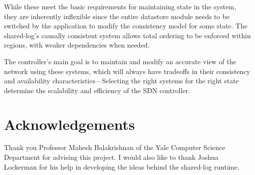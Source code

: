 \documentclass[letterpaper,twocolumn,10pt]{article}
\begin{document}
While these meet the basic requirements for maintaining state in the system, they are inherently inflexible since the entire datastore module needs to be switched by the application to modify the consistency model for some state. The shared-log's causally consistent system allows total ordering to be enforced within regions, with weaker dependencies when needed. 

The controller's main goal is to maintain and modify an accurate view of the network using these systems, which will always have tradeoffs in their consistency and availability characteristics---Selecting the right systems for the right state determine the scalability and efficiency of the SDN controller.


\section*{Acknowledgements}

Thank you Professor Mahesh Balakrishnan of the Yale Computer Science Department for advising this project. I would also like to thank Joshua Lockerman for his help in developing the ideas behind the shared-log runtime.



\end{document}
